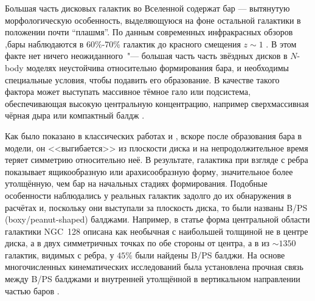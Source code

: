 \documentclass{trlnotes}
\begin{document}
Большая часть дисковых галактик во Вселенной содержат бар --- вытянутую морфологическую особенность, выделяющуюся на 
фоне остальной галактики в положении почти ``плашмя''. По данным современных инфракрасных 
обзоров ,бары наблюдаются в 60\%-70\% галактик до красного смещения $z\sim 1$ \citep{marinova2007}.
В этом факте нет ничего неожиданного~"--- большая часть часть звёздных дисков в $N$-body моделях неустойчива
относительно формирования бара, и необходимы специальные условия, чтобы подавить его образование. В качестве такого
фактора может выступать массивное тёмное гало \underdev или подсистема, обеспечивающая высокую
центральную концентрацию, например сверхмассивная чёрная дыра \citep{shen2004} или компактный балдж
\citep{saha2018}.

%
Как было показано в классических работах \citet{combes1981a} и \citet{raha1991}, вскоре после
образования бара в модели, он <<выгибается>> из плоскости диска и на непродолжительное время теряет симметрию относительно неё. В
результате, галактика при взгляде с ребра показывает ящикообразную или арахисообразную форму, значительное
более утолщённую, чем бар на начальных стадиях формирования. Подобные особенности наблюдались у реальных галактик задолго до их обнаружения в
расчётах и, поскольку они  выступали за плоскость диска, то были названы B/PS (boxy/peanut-shaped) балджами. Например, в статье
\citet{burbidge1959} форма центральной области галактики NGC~128 описана как необычная с наибольшей толщиной не в
центре диска, а в двух симметричных точках по обе стороны от центра, а в \citet{lutticke2000} из $\sim\!1350$ галактик, видимых с ребра, у $45\%$ были найдены B/PS балджи.
На основе многочисленных кинематических исследований была установлена прочная связь между B/PS балджами и внутренней утолщённой в вертикальном направлении частью баров
\citep{kuijken1995,bureau1999,chung2004,bureau2006}. 
\end{document}
